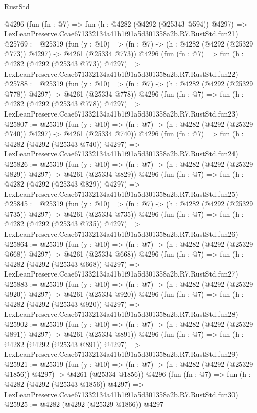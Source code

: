 \begin{lexlean}{RustStd}
\begin{coremodule}
    @4296
    (fun (fn : @7) =>
    fun (h : @4282 (@4292 (@25343 @594)) @4297) =>
    LexLeanPreserve.Ccae671332134a41b1f91a5d301358a2b.R7.RustStd.fun21)
@25769 := @25319
    (fun (y : @10) => (fn : @7) -> (h : @4282 (@4292 (@25329 @773)) @4297) -> @4261 (@25334 @773))
    @4296
    (fun (fn : @7) =>
    fun (h : @4282 (@4292 (@25343 @773)) @4297) =>
    LexLeanPreserve.Ccae671332134a41b1f91a5d301358a2b.R7.RustStd.fun22)
@25788 := @25319
    (fun (y : @10) => (fn : @7) -> (h : @4282 (@4292 (@25329 @778)) @4297) -> @4261 (@25334 @778))
    @4296
    (fun (fn : @7) =>
    fun (h : @4282 (@4292 (@25343 @778)) @4297) =>
    LexLeanPreserve.Ccae671332134a41b1f91a5d301358a2b.R7.RustStd.fun23)
@25807 := @25319
    (fun (y : @10) => (fn : @7) -> (h : @4282 (@4292 (@25329 @740)) @4297) -> @4261 (@25334 @740))
    @4296
    (fun (fn : @7) =>
    fun (h : @4282 (@4292 (@25343 @740)) @4297) =>
    LexLeanPreserve.Ccae671332134a41b1f91a5d301358a2b.R7.RustStd.fun24)
@25826 := @25319
    (fun (y : @10) => (fn : @7) -> (h : @4282 (@4292 (@25329 @829)) @4297) -> @4261 (@25334 @829))
    @4296
    (fun (fn : @7) =>
    fun (h : @4282 (@4292 (@25343 @829)) @4297) =>
    LexLeanPreserve.Ccae671332134a41b1f91a5d301358a2b.R7.RustStd.fun25)
@25845 := @25319
    (fun (y : @10) => (fn : @7) -> (h : @4282 (@4292 (@25329 @735)) @4297) -> @4261 (@25334 @735))
    @4296
    (fun (fn : @7) =>
    fun (h : @4282 (@4292 (@25343 @735)) @4297) =>
    LexLeanPreserve.Ccae671332134a41b1f91a5d301358a2b.R7.RustStd.fun26)
@25864 := @25319
    (fun (y : @10) => (fn : @7) -> (h : @4282 (@4292 (@25329 @668)) @4297) -> @4261 (@25334 @668))
    @4296
    (fun (fn : @7) =>
    fun (h : @4282 (@4292 (@25343 @668)) @4297) =>
    LexLeanPreserve.Ccae671332134a41b1f91a5d301358a2b.R7.RustStd.fun27)
@25883 := @25319
    (fun (y : @10) => (fn : @7) -> (h : @4282 (@4292 (@25329 @920)) @4297) -> @4261 (@25334 @920))
    @4296
    (fun (fn : @7) =>
    fun (h : @4282 (@4292 (@25343 @920)) @4297) =>
    LexLeanPreserve.Ccae671332134a41b1f91a5d301358a2b.R7.RustStd.fun28)
@25902 := @25319
    (fun (y : @10) => (fn : @7) -> (h : @4282 (@4292 (@25329 @891)) @4297) -> @4261 (@25334 @891))
    @4296
    (fun (fn : @7) =>
    fun (h : @4282 (@4292 (@25343 @891)) @4297) =>
    LexLeanPreserve.Ccae671332134a41b1f91a5d301358a2b.R7.RustStd.fun29)
@25921 := @25319
    (fun (y : @10) => (fn : @7) -> (h : @4282 (@4292 (@25329 @1856)) @4297) -> @4261 (@25334 @1856))
    @4296
    (fun (fn : @7) =>
    fun (h : @4282 (@4292 (@25343 @1856)) @4297) =>
    LexLeanPreserve.Ccae671332134a41b1f91a5d301358a2b.R7.RustStd.fun30)
@25925 := @4282 (@4292 (@25329 @1866)) @4297

\end{coremodule}
\end{lexlean}
